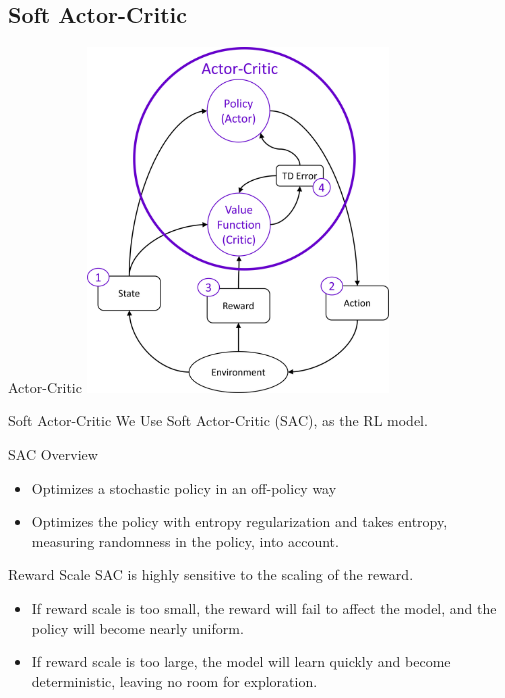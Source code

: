 \subsection{Soft Actor-Critic}
\begin{frame}{Actor-Critic}
    \centering
    \includegraphics[width=8cm]{images/actor_critic.png}
\end{frame}

\begin{frame}{Soft Actor-Critic}
We Use Soft Actor-Critic (SAC), as the RL model.
\begin{block}{SAC Overview}
\begin{itemize}
    \item Optimizes a stochastic policy in an off-policy way
    \item Optimizes the policy with \alert{entropy regularization} and takes entropy, measuring randomness in the policy, into account.
\end{itemize}
\end{block}
\begin{alertblock}{Reward Scale}
SAC is highly sensitive to the scaling of the reward. 
\begin{itemize}
    \item If reward scale is too small, the reward will fail to affect the model, and the policy will become nearly uniform.
    \item If reward scale is too large, the model will learn quickly and become deterministic, leaving no room for exploration.
\end{itemize}
\end{alertblock}
\end{frame}